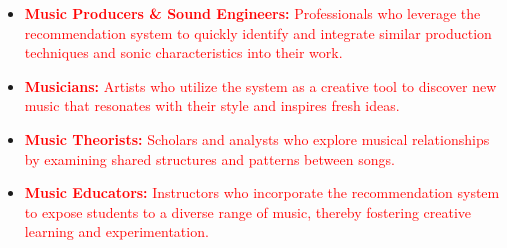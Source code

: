 \documentclass[12pt]{article}
\begin{document}
\begin{itemize}
  \item \textcolor{red}{\textbf{Music Producers \& Sound Engineers:} Professionals who leverage the recommendation system to quickly identify and integrate similar production techniques and sonic characteristics into their work.}
  \item \textcolor{red}{\textbf{Musicians:} Artists who utilize the system as a creative tool to discover new music that resonates with their style and inspires fresh ideas.}
  \item \textcolor{red}{\textbf{Music Theorists:} Scholars and analysts who explore musical relationships by examining shared structures and patterns between songs.}
  \item \textcolor{red}{\textbf{Music Educators:} Instructors who incorporate the recommendation system to expose students to a diverse range of music, thereby fostering creative learning and experimentation.}
\end{itemize}
\end{document}
